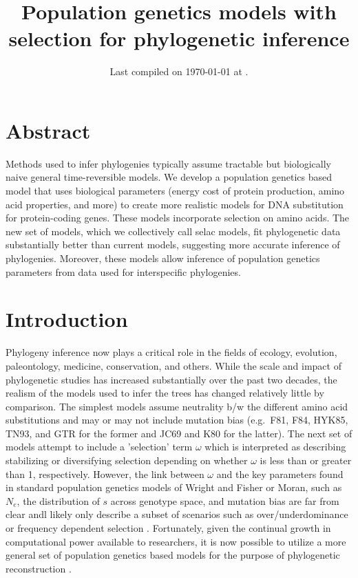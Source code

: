 \documentclass{article}
\title{Population genetics models with selection for phylogenetic
inference} \date{Last compiled on \today\xspace at \currenttime.}
\newcommand{\Ne}{\ensuremath{{N_e}}\xspace} %
\begin{document}
\maketitle


\section*{Abstract}
Methods used to infer phylogenies typically assume tractable but biologically naive general time-reversible models.
We develop a population genetics based model that uses biological parameters (energy cost of protein production, amino acid properties, and more) to create more realistic models for DNA substitution for protein-coding genes. 
These models incorporate selection on amino acids.
The new set of models, which we collectively call selac models, fit phylogenetic data substantially better than current models, suggesting more accurate inference of phylogenies.
Moreover, these models allow inference of population genetics parameters from data used for interspecific phylogenies.

\section*{Introduction}
Phylogeny inference now plays a critical role in the fields of ecology, evolution, paleontology, medicine, conservation, and others.
While the scale and impact of phylogenetic studies has increased substantially over the past two decades, the realism of the models used to infer the trees has changed relatively little by comparison.
The simplest models assume neutrality b/w the different amino acid substitutions and may or may not include mutation bias (e.g.~F81, F84, HYK85, TN93, and GTR for the former and JC69 and K80 for the latter).
The next set of models attempt to include a 'selection' term $\omega$ which is interpreted as describing stabilizing or diversifying selection depending on whether $\omega$ is less than or greater than 1, respectively. 
However, the link between $\omega$ and the key parameters found in standard population genetics models of Wright and Fisher or Moran, such as \Ne, the distribution of $s$ across genotype space, and mutation bias are far from clear andl likely only describe a subset of scenarios such as over/underdominance or frequency dependent selection  \cite{HughesAndNei1988}.
Fortunately, given the continual growth in computational power available to researchers, it is now possible to utilize a more general set of population genetics based models for the purpose of phylogenetic reconstruction \citet[e.g.][]{HalpernAndBruno1988,RobinsonEtAl2003,LartillotAndPhillipe2004,RodrigueAndLartillot2014}.
\end{document}
